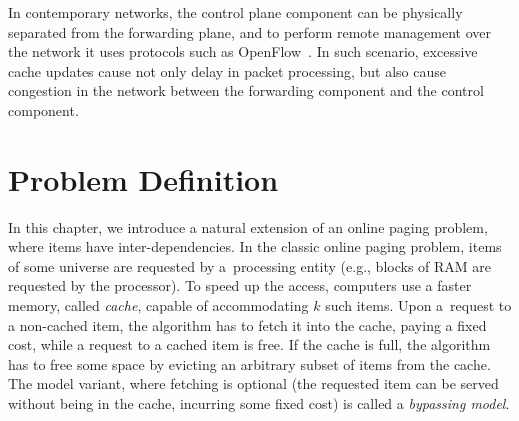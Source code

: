In contemporary networks, the control plane component can be physically separated from the forwarding plane, and to perform remote management over the network it uses protocols such as OpenFlow~\cite{openflow}.
In such scenario, excessive cache updates cause not only delay in packet processing, but also cause congestion in the network between the forwarding component and the control component.



\section{Problem Definition}\label{sec:preliminaries}

%

In this chapter, we introduce a natural extension of an online paging problem, where
items have inter-de\-pen\-den\-cies.
In the classic online paging problem, items of some universe are requested by
a~processing entity (e.g., blocks of RAM are requested by the processor). To
speed up the access, computers use a faster memory, called
\emph{cache}, capable of accommodating $k$ such items. Upon a~request to a
non-cached item, the algorithm has to fetch it into the cache, paying a fixed
cost, while a request to a cached item is free. If the cache is full, the
algorithm has to free some space by evicting an arbitrary subset of items from
the cache.
The model variant, where fetching is optional (the requested item can be served without being in the cache, incurring some fixed cost) is called a \emph{bypassing model}.


